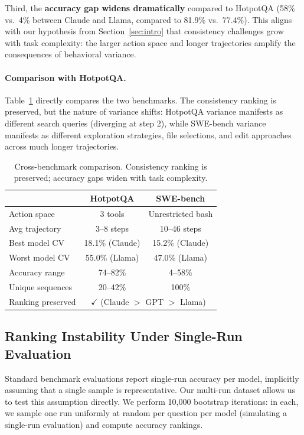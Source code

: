 \documentclass{article}
\begin{document}
Third, the \textbf{accuracy gap widens dramatically} compared to HotpotQA (58\% vs.\ 4\% between Claude and Llama, compared to 81.9\% vs.\ 77.4\%). This aligns with our hypothesis from Section~\ref{sec:intro} that consistency challenges grow with task complexity: the larger action space and longer trajectories amplify the consequences of behavioral variance.

\paragraph{Comparison with HotpotQA.} Table~\ref{tab:cross_benchmark} directly compares the two benchmarks. The consistency ranking is preserved, but the nature of variance shifts: HotpotQA variance manifests as different search queries (diverging at step 2), while SWE-bench variance manifests as different exploration strategies, file selections, and edit approaches across much longer trajectories.

\begin{table}[h]
\centering
\small
\caption{Cross-benchmark comparison. Consistency ranking is preserved; accuracy gaps widen with task complexity.}
\label{tab:cross_benchmark}
\begin{tabular}{lcc}
\toprule
& \textbf{HotpotQA} & \textbf{SWE-bench} \\
\midrule
Action space & 3 tools & Unrestricted bash \\
Avg trajectory & 3--8 steps & 10--46 steps \\
Best model CV & 18.1\% (Claude) & 15.2\% (Claude) \\
Worst model CV & 55.0\% (Llama) & 47.0\% (Llama) \\
Accuracy range & 74--82\% & 4--58\% \\
Unique sequences & 20--42\% & 100\% \\
Ranking preserved & \multicolumn{2}{c}{$\checkmark$ (Claude $>$ GPT $>$ Llama)} \\
\bottomrule
\end{tabular}
\end{table}

\subsection{Ranking Instability Under Single-Run Evaluation}
\label{sec:rankings}

Standard benchmark evaluations report single-run accuracy per model, implicitly assuming that a single sample is representative. Our multi-run dataset allows us to test this assumption directly. We perform 10,000 bootstrap iterations: in each, we sample one run uniformly at random per question per model (simulating a single-run evaluation) and compute accuracy rankings.
\end{document}
